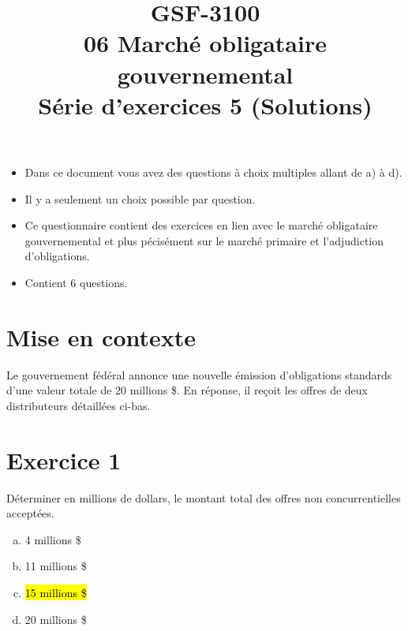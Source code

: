 \documentclass[10pt,a4paper]{article}
\title{GSF-3100 \\
06 Marché obligataire gouvernemental \\
Série d'exercices 5 (Solutions)}
\begin{document}
\maketitle

\begin{itemize}
\item Dans ce document vous avez des questions à choix multiples allant de a) à d).  
\item Il y a seulement un choix possible par question.
\item Ce questionnaire contient des exercices en lien avec le marché obligataire gouvernemental et plus pécisément sur le marché primaire et l'adjudiction d'obligations.
\item Contient 6 questions. 
\end{itemize}
 
\newpage

\section*{Mise en contexte}

Le gouvernement fédéral annonce une nouvelle émission d’obligations standards d’une valeur totale de 20 millions \$.  En réponse, il reçoit les offres de deux distributeurs détaillées ci-bas.  

\begin{table}[H]
\centering
{}
\end{table}

\section*{Exercice 1}
Déterminer en millions de dollars,  le montant total des offres non concurrentielles acceptées.

\begin{enumerate}[a)]
\item 4 millions \$
\item 11 millions \$
\item \hl{15 millions \$}
\item 20 millions \$
\end{enumerate}
\end{document}
